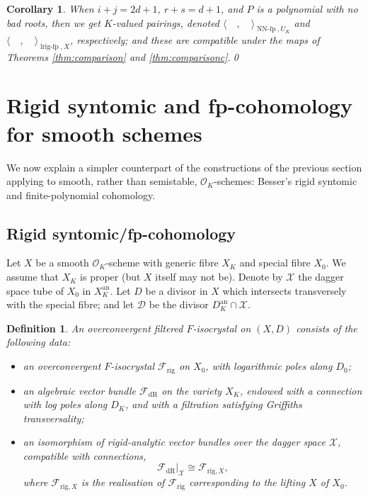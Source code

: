 \documentclass[cjm]{ipart}
\theoremstyle{plain}
\newtheorem{corollary}[theorem]{Corollary}
\newtheorem{definition}[theorem]{Definition}
\theoremstyle{remark}
\DeclareMathOperator{\lrigfp}{lrig-fp}
\DeclareMathOperator{\NNfp}{NN-fp}
\newcommand{\cD}{\mathcal{D}}
\newcommand{\cO}{\mathcal{O}}
\newcommand{\cX}{\mathcal{X}}
\newcommand{\dR}{\mathrm{dR}}
\newcommand{\rig}{\mathrm{rig}}
\newcommand{\sF}{\mathscr{F}}
\numberwithin{equation}{subsection}
\begin{document}
  \begin{corollary}
   When $i+j=2d+1$, $r+s=d+1$, and $P$ is a polynomial with no bad roots, then we get $K$-valued pairings, denoted $\langle\quad,\quad\rangle_{\NNfp, U_K}$ and $\langle\quad,\quad\rangle_{\lrigfp,X}$, respectively; and these are compatible under the maps of Theorems \ref{thm:comparison} and \ref{thm:comparisonc}.\qed
  \end{corollary}


\section{Rigid syntomic and fp-cohomology for smooth schemes}

 We now explain a simpler counterpart of the constructions of the previous section applying to smooth, rather than semistable, $\cO_K$-schemes: Besser's rigid syntomic and finite-polynomial cohomology.

 \subsection{Rigid syntomic/fp-cohomology}\label{sect:rigsyn}

  Let $X$ be a smooth $\cO_K$-scheme with generic fibre $X_K$ and special fibre $X_0$. We assume that $X_K$ is proper (but $X$ itself may not be). Denote by $\cX$ the dagger space tube of $X_0$ in $X_K^{\mathrm{an}}$. Let $D$ be a divisor in $X$ which intersects transversely with the special fibre; and let $\cD$ be the divisor $D_K^{\mathrm{an}} \cap \cX$.

  \begin{definition}
   An \emph{overconvergent filtered $F$-isocrystal} on $(X, D)$ consists of the following data:
   \begin{itemize}
    \item an overconvergent $F$-isocrystal $\sF_{\rig}$ on $X_0$, with logarithmic poles along $D_0$;
    \item an algebraic vector bundle $\sF_{\dR}$ on the variety $X_K$, endowed with a connection with log poles along $D_K$, and with a filtration satisfying Griffiths transversality;
    \item an isomorphism of rigid-analytic vector bundles over the dagger space $\cX$, compatible with connections,
    \[ \sF_{\dR}|_{\cX} \cong \sF_{\rig, X}, \]
    where $\sF_{\rig, X}$ is the realisation of $\sF_{\rig}$ corresponding to the lifting $X$ of $X_0$.
   \end{itemize}
  \end{definition}
\end{document}

